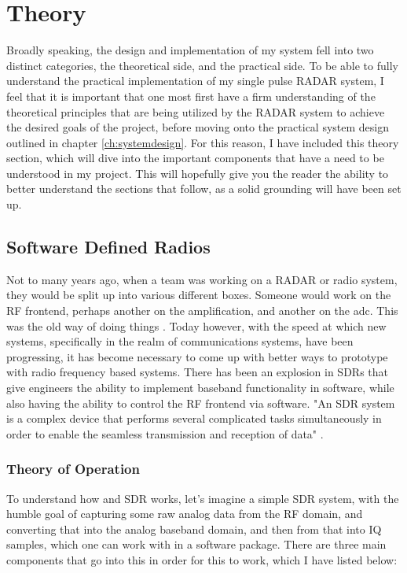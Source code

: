 \documentclass[11pt]{report}
\begin{document}
\chapter{Theory}\label{ch:Theory}
Broadly speaking, the design and implementation of my system fell into two distinct categories, the theoretical side, and the practical side. To be able to fully understand the practical implementation of my single pulse RADAR system, I feel that it is important that one most first have a firm understanding of the theoretical principles that are being utilized by the RADAR system to achieve the desired goals of the project, before moving onto the practical system design outlined in chapter \ref{ch:systemdesign}. For this reason, I have included this theory section, which will dive into the important components that have a need to be understood in my project. This will hopefully give you the reader the ability to better understand the sections that follow, as a solid grounding will have been set up.

\section{Software Defined Radios}
Not to many years ago, when a team was working on a RADAR or radio system, they would be split up into various different boxes. Someone would work on the RF frontend, perhaps another on the amplification, and another on the \gls{adc}. This was the old way of doing things \cite{Software_Defined_Radio_for_Engineers}. Today however, with the speed at which new systems, specifically in the realm of communications systems, have been progressing, it has become necessary to come up with better ways to prototype with radio frequency based systems. There has been an explosion in SDRs that give engineers the ability to implement baseband functionality in software, while also having the ability to control the RF frontend via software. "An SDR system is a complex device that performs several complicated tasks simultaneously in order to enable the seamless transmission and reception of data" \cite{Software_Defined_Radio_for_Engineers}.

\subsection{Theory of Operation}
To understand how and SDR works, let's imagine a simple SDR system, with the humble goal of capturing some raw analog data from the RF domain, and converting that into the analog baseband domain, and then from that into IQ samples, which one can work with in a software package. There are three main components that go into this in order for this to work, which I have listed below:
\end{document}
